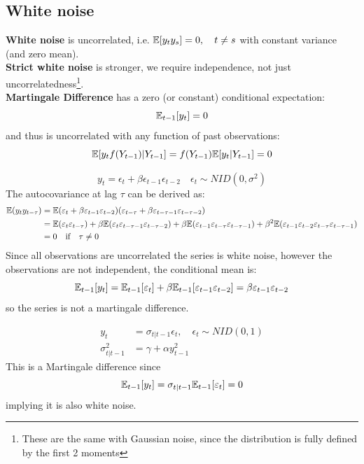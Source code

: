 \documentclass[DIV=14,titlepage=false]{scrreprt}
\begin{document}
\subsection{White noise}
\textbf{White noise} is uncorrelated, i.e. $\mathbb{E}[y_t y_s] = 0, \quad t \neq s$ with constant variance (and zero mean).\\
\textbf{Strict white noise} is stronger, we require independence, not just uncorrelatedness\footnote{These are the same with Gaussian noise, since the distribution is fully defined by the first 2 moments}.\\
\textbf{Martingale Difference} has a zero (or constant) conditional expectation:
\[
    \mathbb{E}_{t-1}[y_t] = 0
\]
and thus is uncorrelated with any function of past observations:
\[
    \mathbb{E}[y_t f(Y_{t-1})|Y_{t-1}] = f(Y_{t-1})\mathbb{E}[y_t|Y_{t-1}] = 0
\]
\begin{example}
    \[
        y_t = \epsilon_t + \beta \epsilon_{t-1} \epsilon_{t-2} \quad \epsilon_t \sim NID(0,\sigma^2)
    \]
    The autocovariance at lag $\tau$ can be derived as:
    \begin{align*}
        \mathbb{E}(y_t y_{t-\tau}) &= \mathbb{E}(\varepsilon_t + \beta \varepsilon_{t-1} \varepsilon_{t-2} )(\varepsilon_{t-\tau} + \beta \varepsilon_{t-\tau-1} \varepsilon_{t-\tau-2})\\
        &= \mathbb{E}(\varepsilon_t \varepsilon_{t-\tau}) + \beta \mathbb{E}(\varepsilon_t \varepsilon_{t-\tau-1} \varepsilon_{t-\tau-2}) + \beta \mathbb{E}(\varepsilon_{t-1} \varepsilon_{t-\tau} \varepsilon_{t-\tau-1}) + \beta^2 \mathbb{E}(\varepsilon_{t-1} \varepsilon_{t-2} \varepsilon_{t-\tau} \varepsilon_{t-\tau-1})\\
        &= 0 \quad \text{if} \quad \tau \neq 0
    \end{align*}
    Since all observations are uncorrelated the series is white noise, however the observations are not independent, the conditional mean is:
    \[
        \mathbb{E}_{t-1}[y_t] = \mathbb{E}_{t-1}[\varepsilon_t] + \beta \mathbb{E}_{t-1}[\varepsilon_{t-1} \varepsilon_{t-2}] = \beta \varepsilon_{t-1} \varepsilon_{t-2}
    \]
    so the series is not a martingale difference.
\end{example}
\begin{example}[ARCH]
    \begin{align*}
        y_t &= \sigma_{t|t-1} \epsilon_t, \quad \epsilon_t \sim NID(0,1)\\
        \sigma_{t|t-1}^2 &= \gamma + \alpha y_{t-1}^2
    \end{align*}
    This is a Martingale difference since 
    \[
        \mathbb{E}_{t-1}[y_t] = \sigma_{t|t-1} \mathbb{E}_{t-1}[\varepsilon_t] = 0
    \]
    implying it is also white noise.
\end{example}
\end{document}
